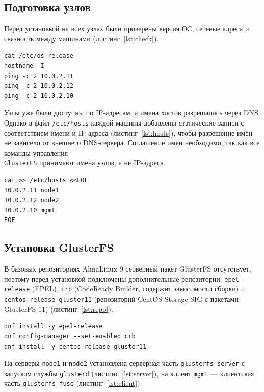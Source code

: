 \subsection{Подготовка узлов}

Перед установкой на всех узлах были проверены версия ОС, сетевые
адреса и связность между машинами (листинг~\ref{lst:check}).

\begin{lstlisting}[caption={Проверка узлов (node1, node2, mgmt)}, label={lst:check}]
cat /etc/os-release
hostname -I
ping -c 2 10.0.2.11
ping -c 2 10.0.2.12
ping -c 2 10.0.2.10
\end{lstlisting}

Узлы уже были доступны по IP-адресам, а имена хостов
разрешались через DNS. Однако в файл \texttt{/etc/hosts} каждой машины добавлены
статические записи с соответствием имени и IP-адреса
(листинг~\ref{lst:hosts}), чтобы разрешение имён не зависело
от внешнего DNS-сервера.
Соглашение имен необходимо, так как все команды управления\\
\texttt{GlusterFS} принимают имена узлов, а не IP-адреса. 


\begin{lstlisting}[caption={Настройка /etc/hosts (node1, node2, mgmt)}, label={lst:hosts}]
cat >> /etc/hosts <<EOF
10.0.2.11 node1
10.0.2.12 node2
10.0.2.10 mgmt
EOF
\end{lstlisting}

\subsection{Установка GlusterFS}

В базовых репозиториях AlmaLinux 9 серверный пакет GlusterFS
отсутствует, поэтому перед установкой подключены дополнительные
репозитории: \texttt{epel-release} (EPEL), \texttt{crb} (CodeReady
Builder, содержит зависимости сборки) и \texttt{centos-release-gluster11}
(репозиторий CentOS Storage SIG с пакетами GlusterFS 11)
(листинг~\ref{lst:repo}).

\begin{lstlisting}[caption={Подключение репозиториев (node1, node2, mgmt)}, label={lst:repo}]
dnf install -y epel-release
dnf config-manager --set-enabled crb
dnf install -y centos-release-gluster11
\end{lstlisting}

На серверы \texttt{node1} и \texttt{node2} установлена серверная часть
\texttt{glusterfs-server} с запуском службы \texttt{glusterd}
(листинг~\ref{lst:server}), на клиент \texttt{mgmt} --- клиентская часть
\texttt{glusterfs-fuse} (листинг~\ref{lst:client}).

